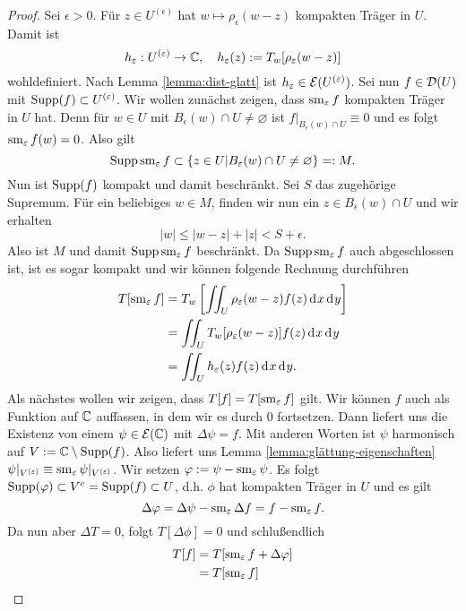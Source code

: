 \begin{proof}
  Sei $\epsilon > 0$. Für $z \in U^{(\epsilon)}$ hat $w \mapsto
  \rho_\epsilon(w - z)$ kompakten Träger in $U$. Damit ist
  \[
  h_\varepsilon : U^{(\varepsilon)} \rightarrow \mathbb{C}, \quad h_\varepsilon(z) :=
  T_w[\rho_\varepsilon(w - z)]
  \]
  wohldefiniert. Nach Lemma \ref{lemma:dist-glatt} ist $h_\varepsilon \in
  \mathcal{E}(U^{(\varepsilon)})$. 
  Sei nun $f \in \mathcal{D}(U)$ mit $\operatorname{Supp}(f) \subset U^{(\varepsilon)}$. Wir
  wollen zunächst zeigen, dass $\operatorname{sm}_\varepsilon f$ kompakten Träger in
  $U$ hat. Denn für $w \in U$ mit
  $B_\epsilon(w) \cap U \neq \varnothing$ ist $f|_{B_\epsilon(w) \cap U}
  \equiv 0$ und es folgt $\operatorname{sm}_\varepsilon f(w) = 0$. Also gilt
  \[
  \operatorname{Supp} \operatorname{sm}_\varepsilon f \subset \{ z \in U | B_\varepsilon(w) \cap U \neq
  \varnothing\} =: M.
  \]
  Nun ist $\operatorname{Supp}(f)$ kompakt und damit
  beschränkt. Sei $S$ das zugehörige Supremum. Für ein beliebiges $w
  \in M$, finden wir nun ein $z \in B_\epsilon(w) \cap U$ und wir
  erhalten
  \[
  |w| \leq |w-z| + |z| < S + \epsilon.
  \]
  Also ist $M$ und damit $\operatorname{Supp} \operatorname{sm}_\varepsilon f$ beschränkt. Da $\operatorname{Supp}
  \operatorname{sm}_\varepsilon f$ auch abgeschlossen ist, ist es sogar kompakt und wir können folgende
  Rechnung durchführen
  \begin{align}
    T[\sm_\epsilon f] & = T_w \left [ \iint_U \rho_\epsilon(w - z)
      f(z) \d[x]\d[y] \right ] \nonumber \\
    & = \iint_U T_w[\rho_\epsilon(w-z)] f(z)
    \d[x]\d[y] \label{eq:weyl} \\
    & = \iint_U h_\epsilon(z) f(z) \d[x]\d[y]. \nonumber
  \end{align}
  Als nächstes wollen wir zeigen, dass $T[f] = T[\operatorname{sm}_\varepsilon f]$
  gilt. Wir können $f$ auch als Funktion auf $\mathbb{C}$ auffassen, in dem
  wir es durch 0 fortsetzen. Dann liefert uns \cite[Kor. 13.3]{For} die
  Existenz von einem $\psi \in \mathcal{E}(\mathbb{C})$ mit $\Delta \psi = f$. 
  Mit anderen Worten ist $\psi$ harmonisch auf $V:= \mathbb{C} \setminus \operatorname{Supp}(f)$. Also
  liefert uns Lemma \ref{lemma:glättung-eigenschaften} $\psi|_{V^{(\varepsilon)}}
  \equiv \operatorname{sm}_\varepsilon \psi|_{V^{(\varepsilon)}}$. Wir setzen $\varphi := \psi -
  \operatorname{sm}_\varepsilon\psi$. Es folgt $\operatorname{Supp}(\varphi) \subset V^c = \operatorname{Supp}(f)
  \subset U$, d.h. $\phi$ hat kompakten Träger in $U$ und es gilt
  \[
  \Delta \varphi = \Delta \psi - \operatorname{sm}_\varepsilon \Delta f = f - \operatorname{sm}_\varepsilon
  f.
  \]
  Da nun aber $\Delta T = 0$, folgt $T[\Delta \phi] = 0$ und
  schlußendlich
  \begin{align*}
    T[f] & = T[\sm_\epsilon f + \Delta \phi] \\
    & = T[\sm_\epsilon f] \\

\end{align*}
\end{proof}
